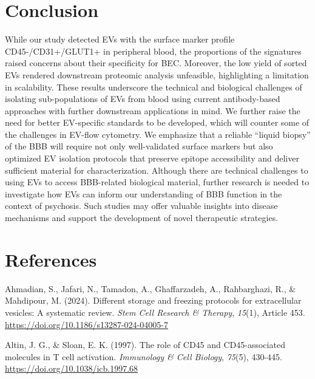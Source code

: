 \documentclass[authordate, empirical, issue]{jote-new-article}
\begin{document}
	\section{Conclusion }



	While our study detected EVs with the surface marker profile CD45-/CD31+/GLUT1+ in peripheral blood, the proportions of the signatures raised concerns about their specificity for BEC. Moreover, the low yield of sorted EVs rendered downstream proteomic analysis unfeasible, highlighting a limitation in scalability. These results underscore the technical and biological challenges of isolating sub-populations of EVs from blood using current antibody-based approaches with further downstream applications in mind. We further raise the need for better EV-specific standards to be developed, which will counter some of the challenges in EV-flow cytometry. We emphasize that a reliable “liquid biopsy” of the BBB will require not only well-validated surface markers but also optimized EV isolation protocols that preserve epitope accessibility and deliver sufficient material for characterization. Although there are technical challenges to using EVs to access BBB-related biological material, further research is needed to investigate how EVs can inform our understanding of BBB function in the context of psychosis. Such studies may offer valuable insights into disease mechanisms and support the development of novel therapeutic strategies.







	\section{References}



	Ahmadian, S., Jafari, N., Tamadon, A., Ghaffarzadeh, A., Rahbarghazi, R., \& Mahdipour, M. (2024). Different storage and freezing protocols for extracellular vesicles: A systematic review. \emph{Stem Cell Research \& Therapy},\emph{ 15}(1), Article 453. \url{https://doi.org/10.1186/s13287-024-04005-7}



	Altin, J. G., \& Sloan, E. K. (1997). The role of CD45 and CD45-associated molecules in T cell activation. \emph{Immunology \& Cell Biology},\emph{ 75}(5), 430-445. \url{https://doi.org/10.1038/icb.1997.68}
\end{document}
